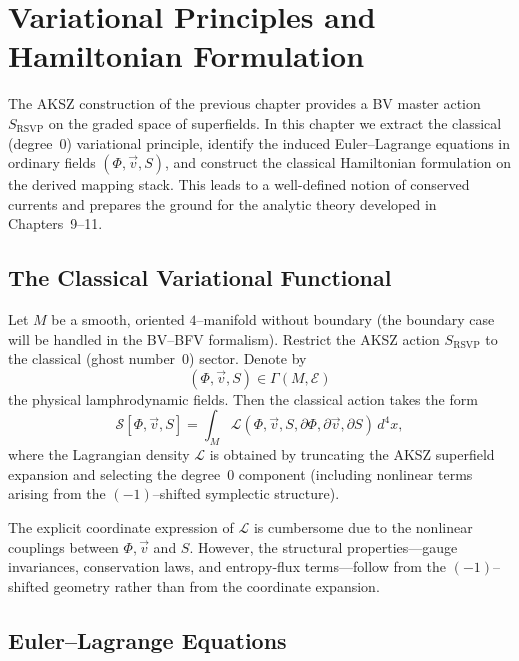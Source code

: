 \chapter{Variational Principles and Hamiltonian Formulation}
\label{ch:variational}

The AKSZ construction of the previous chapter provides a BV
master action $S_{\mathrm{RSVP}}$ on the graded space of superfields.
In this chapter we extract the classical (degree~$0$) variational
principle, identify the induced Euler--Lagrange equations in ordinary
fields $(\Phi,\vec v,S)$, and construct the classical Hamiltonian
formulation on the derived mapping stack.
This leads to a well-defined notion of conserved currents and prepares
the ground for the analytic theory developed in Chapters~9--11.



\section{The Classical Variational Functional}
\label{sec:variational-functional}

Let $M$ be a smooth, oriented $4$--manifold without boundary (the
boundary case will be handled in the BV--BFV formalism).
Restrict the AKSZ action $S_{\mathrm{RSVP}}$ to the classical (ghost
number~$0$) sector. Denote by
\[
(\Phi,\vec v,S)\in \Gamma(M,\mathcal{E})
\]
the physical lamphrodynamic fields.
Then the classical action takes the form
\begin{equation}
\label{eq:classical-action}
\mathcal{S}[\Phi,\vec v,S]
=\int_{M}\mathcal{L}(\Phi,\vec v,S,\partial\Phi,\partial\vec v,
\partial S)\,d^{4}x,
\end{equation}
where the Lagrangian density $\mathcal{L}$ is obtained by truncating
the AKSZ superfield expansion and selecting the degree~$0$ component
(including nonlinear terms arising from the $(-1)$--shifted
symplectic structure).

\begin{remark}
The explicit coordinate expression of $\mathcal{L}$ is cumbersome due
to the nonlinear couplings between $\Phi,\vec v$ and $S$. However, the
structural properties---gauge invariances, conservation laws, and
entropy-flux terms---follow from the $(-1)$--shifted geometry rather
than from the coordinate expansion.
\end{remark}



\section{Euler--Lagrange Equations}
\label{sec:EL-equations}

